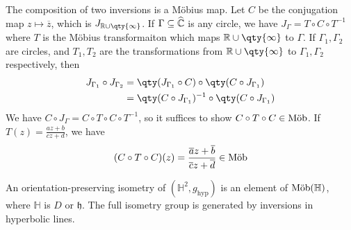 \begin{remark}
	The composition of two inversions is a M\"obius map.
	Let $C$ be the conjugation map $z \mapsto \overline z$, which is $J_{\mathbb R \cup \qty{\infty}}$.
	If $\Gamma \subseteq \widehat{\mathbb C}$ is any circle, we have $J_\Gamma = T \circ C \circ T^{-1}$ where $T$ is the M\"obius transformaiton which maps $\mathbb R \cup \qty{\infty}$ to $\Gamma$.
	If $\Gamma_1, \Gamma_2$ are circles, and $T_1, T_2$ are the transformations from $\mathbb R \cup \qty{\infty}$ to $\Gamma_1, \Gamma_2$ respectively, then
	\begin{align*}
		J_{\Gamma_1} \circ J_{\Gamma_2} & = \qty(J_{\Gamma_1} \circ C) \circ \qty(C \circ J_{\Gamma_1})      \\
		                                & = \qty(C \circ J_{\Gamma_1})^{-1} \circ \qty(C \circ J_{\Gamma_1})
	\end{align*}
	We have $C \circ J_\Gamma = C \circ T \circ C \circ T^{-1}$, so it suffices to show $C \circ T \circ C \in \text{M\"ob}$.
	If $T(z) = \frac{az+b}{cz+d}$, we have
	\begin{align*}
		(C \circ T \circ C)(z) = \frac{\overline a z + \overline b}{\overline c z + \overline d} \in \text{M\"ob}
	\end{align*}
\end{remark}
\begin{lemma}
	An orientation-preserving isometry of $(\mathbb H^2, g_{\text{hyp}})$ is an element of $\text{M\"ob}(\mathbb H)$, where $\mathbb H$ is $D$ or $\mathfrak{h}$.
	The full isometry group is generated by inversions in hyperbolic lines.
\end{lemma}
